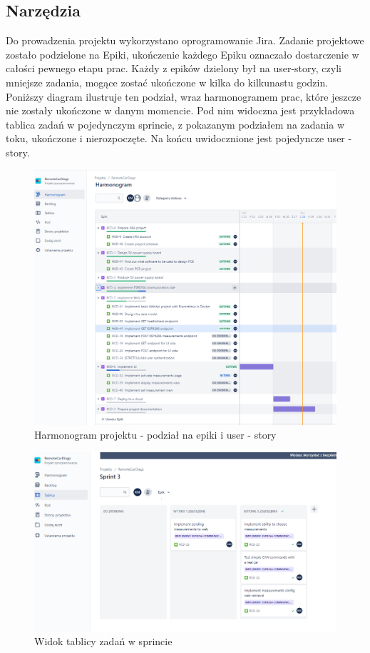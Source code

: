 \documentclass[10pt,a4paper]{scrartcl}
\begin{document}
		\subsection{Narzędzia}
		Do prowadzenia projektu wykorzystano oprogramowanie Jira. Zadanie projektowe zostało podzielone na Epiki, ukończenie każdego Epiku oznaczało dostarczenie w całości pewnego etapu prac. Każdy z epików dzielony był na user-story, czyli mniejsze zadania, mogące zostać ukończone w kilka do kilkunastu godzin. Poniższy diagram ilustruje ten podział, wraz harmonogramem prac, które jeszcze nie zostały ukończone w danym momencie. Pod nim widoczna jest przykładowa tablica zadań w pojedynczym sprincie, z pokazanym podziałem na zadania w toku, ukończone i nierozpoczęte. Na końcu uwidocznione jest pojedyncze user - story.
				
		\begin{figure}[H]
			\centering
			\includegraphics[width=0.9\linewidth]{harmonogram}
			\caption[Harmonogram projektu]{Harmonogram projektu - podział na epiki i user - story}
			\label{fig:harmonogram}
		\end{figure}
		
		\begin{figure}[H]
			\centering
			\includegraphics[width=0.9\linewidth]{sprint}
			\caption[Widok tablicy zadań]{Widok tablicy zadań w sprincie}
			\label{fig:sprint}
		\end{figure}
		
\end{document}

